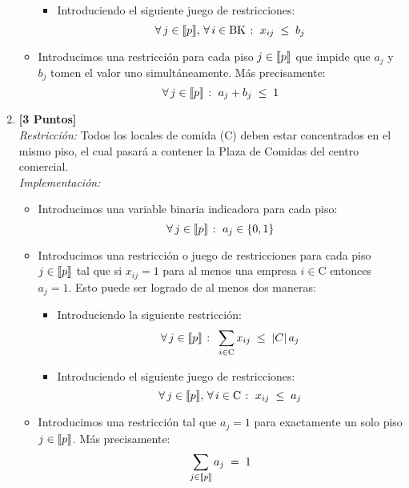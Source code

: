 \documentclass[ a4paper, twoside, 11pt]{article}
\begin{document}
\begin{problem}
\begin{enumerate}[label=\textbf{\alph*)}]
\begin{itemize}
\begin{itemize}
\[\]
\item Introduciendo el siguiente juego de restricciones: 
\[
\forall \, j \in \llbracket p \rrbracket, \, \forall \, i \in \text{BK} \; \colon \;
x_{ij} \; \leq \; b_j
\]
\end{itemize}
\item Introducimos una restricci\'on para cada piso $j \in \llbracket p \rrbracket$ que impide que $a_j$ y $b_j$ tomen el valor uno simult\'aneamente. M\'as precisamente: 
\[
\forall \, j \in \llbracket p \rrbracket \; \colon \; a_j + b_j \; \leq \; 1
\]
\end{itemize}
\item \textbf{[3 Puntos]} \\[1ex]
\emph{Restricci\'on:} Todos los locales de comida (C) deben estar concentrados en el mismo piso, el cual pasar\'a a contener la Plaza de Comidas del centro comercial. \\[1ex]
\emph{Implementaci\'on:}
\begin{itemize}
\item Introducimos una variable binaria indicadora para cada piso: 
\[
\forall \, j \in \llbracket p \rrbracket \; \colon \; a_j \in \{ 0, 1 \}
\]
\item Introducimos una restricci\'on o juego de restricciones para cada piso $j \in \llbracket p \rrbracket$ tal que si $x_{ij} = 1$ para al menos una empresa $i \in \text{C}$ entonces $a_j = 1$. Esto puede ser logrado de al menos dos maneras: 
\begin{itemize}
\item Introduciendo la siguiente restricci\'on: 
\[
\forall \, j \in \llbracket p \rrbracket \; \colon \;
\sum_{i \in \text{C}} x_{ij} \; \leq \; |C| \, a_j
\]
\item Introduciendo el siguiente juego de restricciones: 
\[
\forall \, j \in \llbracket p \rrbracket, \, \forall \, i \in \text{C} \; \colon \;
x_{ij} \; \leq \; a_j
\]
\end{itemize}
\item Introducimos una restricci\'on tal que $a_j = 1$ para exactamente un solo piso $j \in \llbracket p \rrbracket$. M\'as precisamente: 
\[
\sum_{j \in \llbracket p \rrbracket} a_j \; = \; 1
\]
\end{itemize}


\end{enumerate}
\end{problem}
\end{document}
